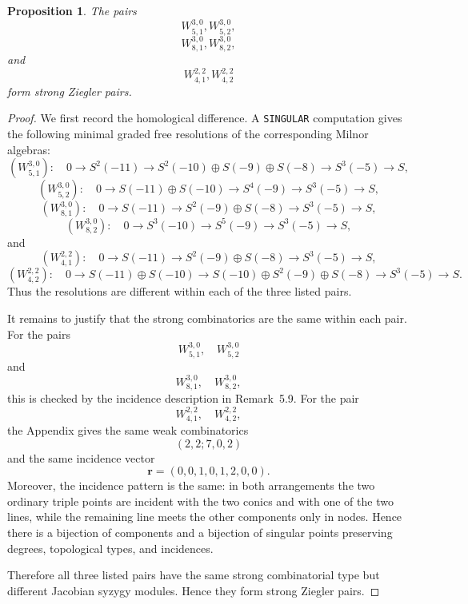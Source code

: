 \documentclass[11pt]{article}
\theoremstyle{plain}
\newtheorem{proposition}[thm]{Proposition}
\theoremstyle{definition}
\begin{document}
\newpage
\begin{proposition}\label{prop:strong-ziegler-pairs}
The pairs \[W^{3,0}_{5,1},W^{3,0}_{5,2},\] \[W^{3,0}_{8,1},W^{3,0}_{8,2},\]  and \[W^{2,2}_{4,1}, W^{2,2}_{4,2}\] form strong Ziegler pairs.
\end{proposition}

\begin{proof}
We first record the homological difference. A \texttt{SINGULAR} computation gives the following minimal graded free resolutions of the corresponding Milnor algebras:
\[
\left(W^{3,0}_{5,1}\right):
\quad
0\longrightarrow S^2(-11)
\longrightarrow S^2(-10)\oplus S(-9)\oplus S(-8)
\longrightarrow S^3(-5)
\longrightarrow S,
\]
\[
\left(W^{3,0}_{5,2}\right):
\quad
0\longrightarrow S(-11)\oplus S(-10)
\longrightarrow S^4(-9)
\longrightarrow S^3(-5)
\longrightarrow S,
\]
\[
\left(W^{3,0}_{8,1}\right):
\quad
0\longrightarrow S(-11)
\longrightarrow S^2(-9)\oplus S(-8)
\longrightarrow S^3(-5)
\longrightarrow S,
\]
\[
\left(W^{3,0}_{8,2}\right):
\quad
0\longrightarrow S^3(-10)
\longrightarrow S^5(-9)
\longrightarrow S^3(-5)
\longrightarrow S,
\]
and
\[
\left(W^{2,2}_{4,1}\right):
\quad
0\longrightarrow S(-11)
\longrightarrow S^2(-9)\oplus S(-8)
\longrightarrow S^3(-5)
\longrightarrow S,
\]
\[
\left(W^{2,2}_{4,2}\right):
\quad
0\longrightarrow S(-11)\oplus S(-10)
\longrightarrow S(-10)\oplus S^2(-9)\oplus S(-8)
\longrightarrow S^3(-5)
\longrightarrow S.
\]
Thus the resolutions are different within each of the three listed pairs.

It remains to justify that the strong combinatorics are the same within each pair. For the pairs
\[
W^{3,0}_{5,1},\quad W^{3,0}_{5,2}
\]
and
\[
W^{3,0}_{8,1},\quad W^{3,0}_{8,2},
\]
this is checked by the incidence description in Remark~5.9. For the pair
\[
W^{2,2}_{4,1},\quad W^{2,2}_{4,2},
\]
the Appendix gives the same weak combinatorics
\[
(2,2;7,0,2)
\]
and the same incidence vector
\[
\mathbf{r}=(0,0,1,0,1,2,0,0).
\]
Moreover, the incidence pattern is the same: in both arrangements the two ordinary triple points are incident with the two conics and with one of the two lines, while the remaining line meets the other components only in nodes. Hence there is a bijection of components and a bijection of singular points preserving degrees, topological types, and incidences.

Therefore all three listed pairs have the same strong combinatorial type but different Jacobian syzygy modules. Hence they form strong Ziegler pairs.
\end{proof}
\end{document}
